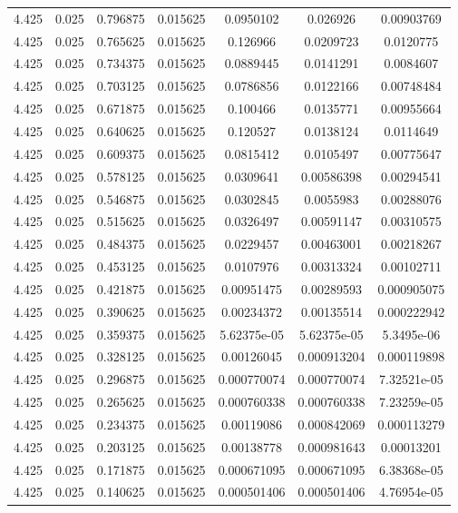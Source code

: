 \begin{flushleft}
\begin{longtable}{ccccccc}
4.425 & 0.025 & 0.796875 & 0.015625 & 0.0950102 & 0.026926 & 0.00903769  \\ 
4.425 & 0.025 & 0.765625 & 0.015625 & 0.126966 & 0.0209723 & 0.0120775  \\ 
4.425 & 0.025 & 0.734375 & 0.015625 & 0.0889445 & 0.0141291 & 0.0084607  \\ 
4.425 & 0.025 & 0.703125 & 0.015625 & 0.0786856 & 0.0122166 & 0.00748484  \\ 
4.425 & 0.025 & 0.671875 & 0.015625 & 0.100466 & 0.0135771 & 0.00955664  \\ 
4.425 & 0.025 & 0.640625 & 0.015625 & 0.120527 & 0.0138124 & 0.0114649  \\ 
4.425 & 0.025 & 0.609375 & 0.015625 & 0.0815412 & 0.0105497 & 0.00775647  \\ 
4.425 & 0.025 & 0.578125 & 0.015625 & 0.0309641 & 0.00586398 & 0.00294541  \\ 
4.425 & 0.025 & 0.546875 & 0.015625 & 0.0302845 & 0.0055983 & 0.00288076  \\ 
4.425 & 0.025 & 0.515625 & 0.015625 & 0.0326497 & 0.00591147 & 0.00310575  \\ 
4.425 & 0.025 & 0.484375 & 0.015625 & 0.0229457 & 0.00463001 & 0.00218267  \\ 
4.425 & 0.025 & 0.453125 & 0.015625 & 0.0107976 & 0.00313324 & 0.00102711  \\ 
4.425 & 0.025 & 0.421875 & 0.015625 & 0.00951475 & 0.00289593 & 0.000905075  \\ 
4.425 & 0.025 & 0.390625 & 0.015625 & 0.00234372 & 0.00135514 & 0.000222942  \\ 
4.425 & 0.025 & 0.359375 & 0.015625 & 5.62375e-05 & 5.62375e-05 & 5.3495e-06  \\ 
4.425 & 0.025 & 0.328125 & 0.015625 & 0.00126045 & 0.000913204 & 0.000119898  \\ 
4.425 & 0.025 & 0.296875 & 0.015625 & 0.000770074 & 0.000770074 & 7.32521e-05  \\ 
4.425 & 0.025 & 0.265625 & 0.015625 & 0.000760338 & 0.000760338 & 7.23259e-05  \\ 
4.425 & 0.025 & 0.234375 & 0.015625 & 0.00119086 & 0.000842069 & 0.000113279  \\ 
4.425 & 0.025 & 0.203125 & 0.015625 & 0.00138778 & 0.000981643 & 0.00013201  \\ 
4.425 & 0.025 & 0.171875 & 0.015625 & 0.000671095 & 0.000671095 & 6.38368e-05  \\ 
4.425 & 0.025 & 0.140625 & 0.015625 & 0.000501406 & 0.000501406 & 4.76954e-05  \\ 

\end{longtable}
\end{flushleft}
